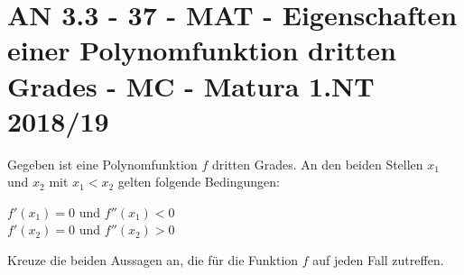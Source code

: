 \section{AN 3.3 - 37 - MAT - Eigenschaften einer Polynomfunktion dritten Grades - MC - Matura 1.NT 2018/19}

\begin{beispiel}[AN 3.3]{1}
Gegeben ist eine Polynomfunktion $f$ dritten Grades. An den beiden Stellen $x_1$ und $x_2$ mit $x_1<x_2$ gelten folgende Bedingungen:\leer

$f'(x_1)=0$ und $f''(x_1)<0$\\
$f'(x_2)=0$ und $f''(x_2)>0$\leer

Kreuze die beiden Aussagen an, die für die Funktion $f$ auf jeden Fall zutreffen.

\end{beispiel}
